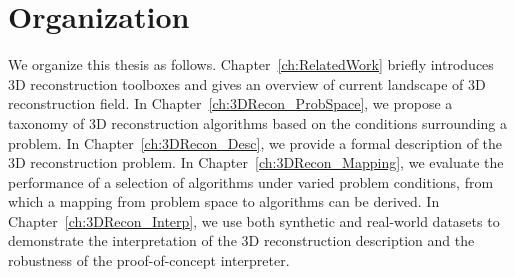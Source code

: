 



\section{Organization}
We organize this thesis as follows. Chapter~\ref{ch:RelatedWork} briefly introduces 3D reconstruction toolboxes and gives an overview of current landscape of 3D reconstruction field. In Chapter~\ref{ch:3DRecon_ProbSpace}, we propose a taxonomy of 3D reconstruction algorithms based on the conditions surrounding a problem. In Chapter~\ref{ch:3DRecon_Desc}, we provide a formal description of the 3D reconstruction problem. In Chapter~\ref{ch:3DRecon_Mapping}, we evaluate the performance of a selection of algorithms under varied problem conditions, from which a mapping from problem space to algorithms can be derived. In Chapter~\ref{ch:3DRecon_Interp}, we use both synthetic and real-world datasets to demonstrate the interpretation of the 3D reconstruction description and the robustness of the proof-of-concept interpreter.